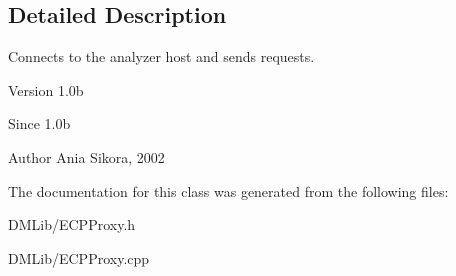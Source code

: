 \subsection{Detailed Description}
Connects to the analyzer host and sends requests. 

\begin{DoxyVersion}{Version}
1.\-0b 
\end{DoxyVersion}
\begin{DoxySince}{Since}
1.\-0b 
\end{DoxySince}
\begin{DoxyAuthor}{Author}
Ania Sikora, 2002 
\end{DoxyAuthor}


The documentation for this class was generated from the following files\-:\begin{DoxyCompactItemize}
\item 
D\-M\-Lib/E\-C\-P\-Proxy.\-h\item 
D\-M\-Lib/E\-C\-P\-Proxy.\-cpp\end{DoxyCompactItemize}
